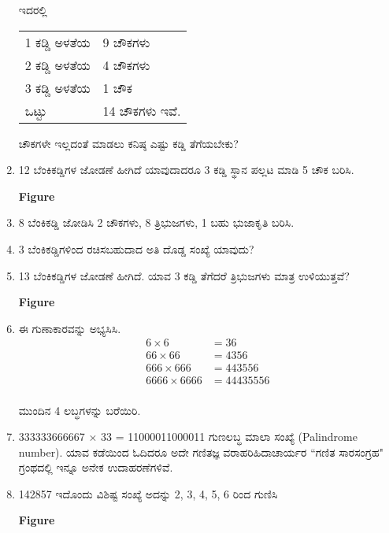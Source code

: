 \begin{enumerate}
ಇದರಲ್ಲಿ 

\begin{tabular}{ll}
1 ಕಡ್ಡಿ ಅಳತೆಯ  & 9 ಚೌಕಗಳು \\
2 ಕಡ್ಡಿ ಅಳತೆಯ & 4 ಚೌಕಗಳು\\
3 ಕಡ್ಡಿ ಅಳತೆಯ & 1 ಚೌಕ\\
\hline
\qquad ಒಟ್ಟು & 14 ಚೌಕಗಳು ಇವೆ.\\
\hline
\end{tabular}

ಚೌಕಗಳೇ ಇಲ್ಲದಂತೆ ಮಾಡಲು ಕನಿಷ್ಠ ಎಷ್ಟು ಕಡ್ಡಿ ತೆಗೆಯಬೇಕು? 

\item 12 ಬೆಂಕಿಕಡ್ಡಿಗಳ ಜೋಡಣೆ ಹೀಗಿದೆ ಯಾವುದಾದರೂ 3 ಕಡ್ಡಿ ಸ್ಥಾನ ಪಲ್ಲಟ ಮಾಡಿ 5 ಚೌಕ ಬರಿಸಿ. 

\begin{center}
{\bf Figure}
\end{center}

\item 8 ಬೆಂಕಿಕಡ್ಡಿ ಜೋಡಿಸಿ 2 ಚೌಕಗಳು, 8 ತ್ರಿಭುಜಗಳು, 1 ಬಹು ಭುಜಾಕೃತಿ ಬರಿಸಿ. 

\item 3 ಬೆಂಕಿಕಡ್ಡಿಗಳಿಂದ ರಚಿಸಬಹುದಾದ ಅತಿ ದೊಡ್ಡ ಸಂಖ್ಯೆ ಯಾವುದು? 

\item 13 ಬೆಂಕಿಕಡ್ಡಿಗಳ ಜೋಡಣೆ ಹೀಗಿದೆ. ಯಾವ 3 ಕಡ್ಡಿ ತೆಗೆದರೆ ತ್ರಿಭುಜಗಳು ಮಾತ್ರ ಉಳಿಯುತ್ತವೆ? 

\begin{center}
{\bf Figure}
\end{center}

\item ಈ ಗುಣಾಕಾರವನ್ನು ಅಭ್ಯಸಿಸಿ. 
\begin{align*}
6 \times 6 & = 36\\
66 \times 66 & = 4356\\
666 \times 666 & = 443556\\
6666 \times 6666 & = 44435556\\
\end{align*}

ಮುಂದಿನ 4 ಲಬ್ಧಗಳನ್ನು ಬರೆಯಿರಿ. 

\item 333333666667 $\times$ 33 = 11000011000011 ಗುಣಲಬ್ಧ ಮಾಲಾ ಸಂಖ್ಯೆ (Palindrome number). ಯಾವ ಕಡೆಯಿಂದ ಓದಿದರೂ ಅದೇ ಗಣಿತಜ್ಞ ವರಾಹರಿಹಿದಾಚಾರ್ಯರ “ಗಣಿತ ಸಾರಸಂಗ್ರಹ" ಗ್ರಂಥದಲ್ಲಿ ಇನ್ನೂ ಅನೇಕ ಉದಾಹರಣೆಗಳಿವೆ.

\item 142857 ಇದೊಂದು ವಿಶಿಷ್ಟ ಸಂಖ್ಯೆ ಅದನ್ನು 2, 3, 4, 5, 6 ರಿಂದ ಗುಣಿಸಿ

\begin{center}
{\bf Figure}
\end{center}


\end{enumerate}
